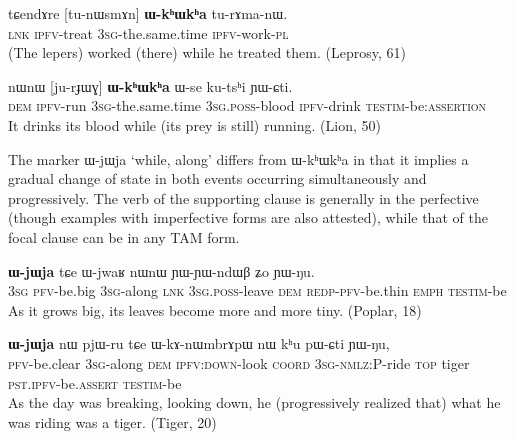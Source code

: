 \documentclass[oldfontcommands,oneside,a4paper,11pt]{article}
\newcommand{\ipa}[1]{{\phon \mbox{#1}}} %
\begin{document}
\begin{exe}
\ex \label{ex:WkhWkha1}
\gll
\ipa{tɕendɤre}  	[\ipa{tu-nɯsmɤn}]  	\textbf{\ipa{ɯ-kʰɯkʰa}}  	\ipa{tu-rɤma-nɯ.}  \\
\textsc{lnk} \textsc{ipfv}-treat \textsc{3sg}-the.same.time \textsc{ipfv}-work-\textsc{pl} \\
\glt (The lepers) worked (there) while he treated them. (Leprosy, 61)
\end{exe}
\begin{exe}
\ex \label{ex:WkhWkha2}
\gll
\ipa{nɯnɯ}  	[\ipa{ju-rɟɯɣ}]  	\textbf{\ipa{ɯ-kʰɯkʰa}}  	\ipa{ɯ-se}  	\ipa{ku-tsʰi}  	\ipa{ɲɯ-ɕti.}  \\
\textsc{dem} \textsc{ipfv}-run \textsc{3sg}-the.same.time \textsc{3sg.poss}-blood \textsc{ipfv}-drink  \textsc{testim}-be:\textsc{assertion} \\
\glt It drinks its blood while (its prey is still) running. (Lion, 50)
\end{exe}



The marker \ipa{ɯ-jɯja} `while, along'  differs from \ipa{ɯ-kʰɯkʰa} in that it implies a gradual change of state in both events occurring simultaneously and progressively. The verb of the supporting clause is generally in the perfective (though examples with imperfective forms are also attested), while that of the focal clause can be in any TAM form.


\begin{exe}
\ex \label{ex:WjWja1}
\gll
[\ipa{ɯʑo}  	\ipa{tɤ-wxti}]  	\textbf{\ipa{ɯ-jɯja}}  	\ipa{tɕe}  	\ipa{ɯ-jwaʁ}  	\ipa{nɯnɯ}  	\ipa{ɲɯ-ɲɯ-ndɯβ}  	\ipa{ʑo}  	\ipa{ɲɯ-ŋu.}  	\\
\textsc{3sg} \textsc{pfv}-be.big  \textsc{3sg}-along \textsc{lnk} \textsc{3sg.poss}-leave \textsc{dem} \textsc{redp-pfv}-be.thin \textsc{emph} \textsc{testim}-be \\
\glt As it grows big, its leaves become more and more tiny. (Poplar, 18)
\end{exe}

     \begin{exe}
   \ex \label{ex:khu}
   \gll  [\ipa{lɤ-fsoʁ}]  	\textbf{\ipa{ɯ-jɯja}}  	\ipa{nɯ}  	\ipa{pjɯ-ru}  	\ipa{tɕe}  	\ipa{ɯ-kɤ-nɯmbrɤpɯ}  	\ipa{nɯ}  	\ipa{kʰu}  	\ipa{pɯ-ɕti}  	\ipa{ɲɯ-ŋu,}  \\
\textsc{pfv}-be.clear    \textsc{3sg}-along  \textsc{dem} \textsc{ipfv:down}-look \textsc{coord} \textsc{3sg-nmlz:P}-ride \textsc{top} tiger \textsc{pst.ipfv}-be.\textsc{assert}  \textsc{testim}-be \\
\glt As the day was breaking, looking down, he (progressively realized that) what he was riding was a tiger. (Tiger, 20)
\end{exe}
\end{document}
